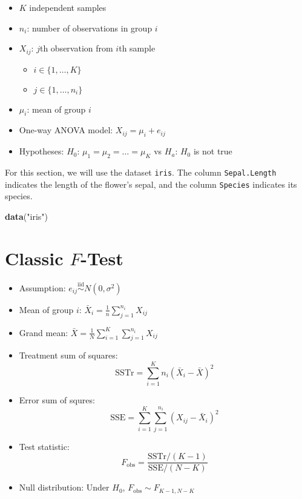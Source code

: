 \documentclass[
]{book}
\newenvironment{Shaded}{\begin{snugshade}}{\end{snugshade}}
\newcommand{\KeywordTok}[1]{\textcolor[rgb]{0.13,0.29,0.53}{\textbf{#1}}}
\newcommand{\NormalTok}[1]{#1}
\newcommand{\StringTok}[1]{\textcolor[rgb]{0.31,0.60,0.02}{#1}}
\providecommand{\tightlist}{%
  \setlength{\itemsep}{0pt}\setlength{\parskip}{0pt}}
\begin{document}
\begin{itemize}
\tightlist
\item
  \(K\) independent samples
\item
  \(n_i\): number of observations in group \(i\)
\item
  \(X_{ij}\): \(j\)th observation from \(i\)th sample

  \begin{itemize}
  \tightlist
  \item
    \(i \in \{1, \dots, K\}\)
  \item
    \(j \in \{1, \dots, n_i\}\)
  \end{itemize}
\item
  \(\mu_i\): mean of group \(i\)
\item
  One-way ANOVA model: \(X_{ij} = \mu_i + e_{ij}\)
\item
  Hypotheses: \(H_0\): \(\mu_1 = \mu_2 = \dots = \mu_K\) vs
  \(H_a\): \(H_0\) is not true
\end{itemize}

For this section, we will use the dataset \texttt{iris}.
The column \texttt{Sepal.Length} indicates the length of the flower's sepal,
and the column \texttt{Species} indicates its species.

\begin{Shaded}
\begin{Highlighting}[]
\KeywordTok{data}\NormalTok{(}\StringTok{"iris"}\NormalTok{)}
\end{Highlighting}
\end{Shaded}

\hypertarget{classic-f-test}{%
\section{\texorpdfstring{Classic \(F\)-Test}{Classic F-Test}}\label{classic-f-test}}

\begin{itemize}
\tightlist
\item
  Assumption: \(e_{ij} \overset{\mathrm{iid}} \sim N(0, \sigma^2)\)
\item
  Mean of group \(i\): \(\bar{X}_i = \frac{1}{n} \sum_{j = 1}^{n_i} X_{ij}\)
\item
  Grand mean: \(\bar{X} = \frac{1}{N} \sum_{i=1}^K \sum_{j=1}^{n_i} X_{ij}\)
\item
  Treatment sum of squares:
  \[\mathrm{SSTr} = \sum_{i=1}^K n_i (\bar{X}_i - \bar{X})^2\]
\item
  Error sum of squres:
  \[\mathrm{SSE} = \sum_{i=1}^K \sum_{j=1}^{n_i} (X_{ij} - \bar{X}_i)^2\]
\item
  Test statistic:
  \[F_{\mathrm{obs}} = \frac{\mathrm{SSTr}/(K-1)}{\mathrm{SSE}/(N-K)}\]
\item
  Null distribution: Under \(H_0\), \(F_{\mathrm{obs}} \sim F_{K-1, N-K}\)
\end{itemize}
\end{document}
